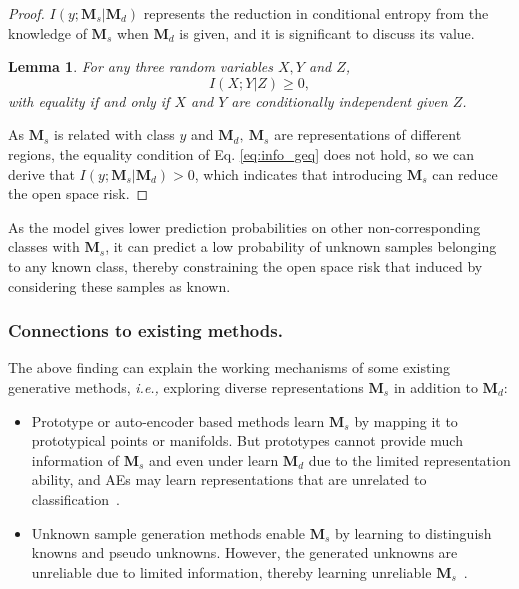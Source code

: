 \documentclass[letterpaper]{article} %
\newtheorem{lemma}{Lemma}
\begin{document}
\begin{proof}
$I(y;\boldsymbol{M}_s|\boldsymbol{M}_d)$ represents the reduction in conditional entropy from the knowledge of $\boldsymbol{M}_s$ when $\boldsymbol{M}_d$ is given, and it is significant to discuss its value.
\begin{lemma} \cite{cover2012elements} 
For any three random variables $X,Y$ and $Z$,
\begin{equation}
I(X;Y|Z)\geq0,
\label{eq:info_geq}
\end{equation}
with equality if and only if $X$ and $Y$ are conditionally independent given $Z$.
\end{lemma}

As $\boldsymbol{M}_s$ is related with class $y$ and $\boldsymbol{M}_d,\ \boldsymbol{M}_s$ are representations of different regions, the equality condition of Eq. \eqref{eq:info_geq} does not hold, so we can derive that $I(y;\boldsymbol{M}_s|\boldsymbol{M}_d)>0$, which indicates that introducing $\boldsymbol{M}_s$ can reduce the open space risk.
\end{proof}

As the model gives lower prediction probabilities on other non-corresponding classes with $\boldsymbol{M}_s$, it can predict a low probability of unknown samples belonging to any known class, thereby constraining the open space risk that induced by considering these samples as known.

\subsubsection{Connections to existing methods.} 
The above finding can explain the working mechanisms of some existing generative methods, \emph{i.e.,} exploring diverse representations $\boldsymbol{M}_s$ in addition to $\boldsymbol{M}_d$:
\begin{itemize}
    \item Prototype or auto-encoder based methods learn $\boldsymbol{M}_s$ by mapping it to prototypical points or manifolds. But prototypes cannot provide much information of $\boldsymbol{M}_s$ and even under learn $\boldsymbol{M}_d$ due to the limited representation ability, and AEs may learn representations that are unrelated to classification~\cite{huang2023class}.
    \item Unknown sample generation methods enable $\boldsymbol{M}_s$ by learning to distinguish knowns and pseudo unknowns. However, the generated unknowns are unreliable due to limited information, thereby learning unreliable $\boldsymbol{M}_s$~\cite{kong2022opengan}.
\end{itemize}
\end{document}
